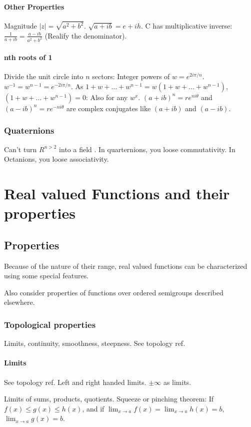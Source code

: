 \documentclass[oneside, article]{memoir}
\begin{document}
\subsection{Other Properties}
Magnitude $|z| = \sqrt{a^{2} + b^{2}}$. $\sqrt{a+ib} = e+ih$. C has multiplicative inverse: $\frac{1}{a+ib}=\frac{a-ib}{a^{2}+b^{2}}$ (Realify the denominator).

\subsection{nth roots of 1}
Divide the unit circle into $n$ sectors: Integer powers of $w=e^{2i\pi/n}$. $w^{-1}=w^{n-1}=e^{-2i\pi/n}$. As $1+w+ \dots + w^{n-1} = w(1+w+ \dots + w^{n-1})$, $(1+w+ \dots + w^{n-1}) = 0$: Also for any $w^{x}$. $(a+ib)^{n} = re^{ni\theta}$ and $(a-ib)^{n} = re^{-ni\theta}$ are complex conjugates like $(a+ib)$ and $(a-ib)$.

\section{Quaternions}
Can't turn $R^{n>2}$ into a field \chk. In quarternions, you loose commutativity. In Octanions, you loose associativity.

\part{Real valued Functions and their properties}
\chapter{Properties}
Because of the nature of their range, real valued functions can be characterized using some special features.

Also consider properties of functions over ordered semigroups described elsewhere.

\section{Topological properties}
Limits, continuity, smoothness, steepness. See topology ref.

\subsection{Limits}
See topology ref. Left and right handed limits. $\pm \infty$ as limits.

Limits of sums, products, quotients. Squeeze or pinching theorem: If $f(x) \leq g(x) \leq h(x)$, and if $\lim_{x \to a} f(x) = \lim_{x \to a} h(x) = b$, $\lim_{x \to a} g(x)=b$.
\end{document}
